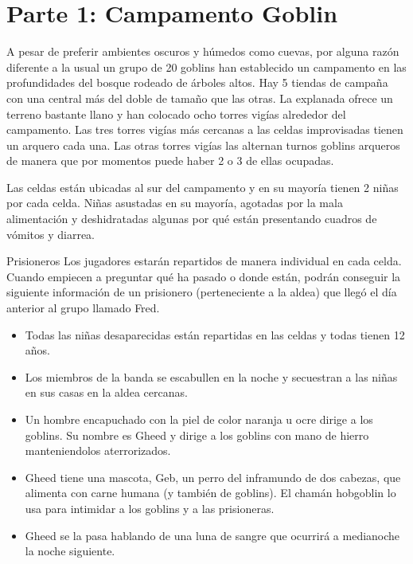 \documentclass[10pt,twoside,twocolumn,openany]{dndbook}
\begin{document}
\section{Parte 1: Campamento Goblin}

A pesar de preferir ambientes oscuros y húmedos como cuevas, por alguna razón diferente a la usual un grupo de 20 goblins han establecido un campamento en las profundidades del bosque rodeado de árboles altos. Hay 5 tiendas de campaña con una central más del doble de tamaño que las otras. La explanada ofrece un terreno bastante llano y han colocado ocho torres vigías alrededor del campamento. Las tres torres vigías más cercanas a las celdas improvisadas tienen un arquero cada una. Las otras torres vigías las alternan turnos goblins arqueros de manera que por momentos puede haber 2 o 3 de ellas ocupadas.

Las celdas están ubicadas al sur del campamento y en su mayoría tienen 2 niñas por cada celda. Niñas asustadas en su mayoría, agotadas por la mala alimentación y deshidratadas algunas por qué están presentando cuadros de vómitos y diarrea.

\begin{DndComment}{Prisioneros}
Los jugadores estarán repartidos de manera individual en cada celda. Cuando empiecen a preguntar qué ha pasado o donde están, podrán conseguir la siguiente información de un prisionero (perteneciente a la aldea) que llegó el día anterior al grupo llamado Fred.

\begin{itemize}
    \item Todas las niñas desaparecidas están repartidas en las celdas y todas tienen 12 años.
    \item Los miembros de la banda se escabullen en la noche y secuestran a las niñas en sus casas en la aldea cercanas.
    \item Un hombre encapuchado con la piel de color naranja u ocre dirige a los goblins. Su nombre es Gheed y dirige a los goblins con mano de hierro manteniendolos aterrorizados.
    \item Gheed tiene una mascota, Geb, un perro del inframundo de dos cabezas, que alimenta con carne humana (y también de goblins). El chamán hobgoblin lo usa para intimidar a los goblins y a las prisioneras.
    \item Gheed se la pasa hablando de una luna de sangre que ocurrirá a medianoche la noche siguiente.
\end{itemize}

\end{DndComment}
\end{document}
